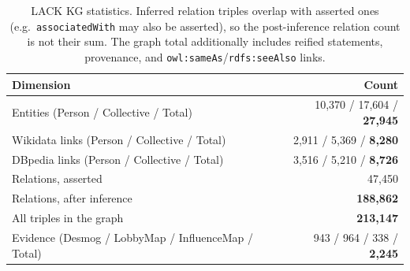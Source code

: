 

\begin{table}[t]
\centering
\caption{LACK KG statistics. Inferred relation triples overlap with asserted ones (e.g.\ \texttt{associatedWith} may also be asserted), so the post-inference relation count is not their sum. The graph total additionally includes reified statements, provenance, and \texttt{owl:sameAs}/\texttt{rdfs:seeAlso} links.}
\label{tab:kg-stats}
\small
\begin{tabular}{lr}
\toprule
\textbf{Dimension} & \textbf{Count} \\
\midrule
Entities (Person / Collective / Total)
  & 10,370 / 17,604 / \textbf{27,945} \\
\quad Wikidata links (Person / Collective / Total)
  & 2,911 / 5,369 / \textbf{8,280} \\
\quad DBpedia links (Person / Collective / Total)
  & 3,516 / 5,210 / \textbf{8,726} \\
\midrule
Relations, asserted          & 47,450 \\
Relations, after inference   & \textbf{188,862} \\
All triples in the graph     & \textbf{213,147} \\
Evidence (Desmog / LobbyMap / InfluenceMap / Total)
  & 943 / 964 / 338 / \textbf{2,245} \\
\bottomrule
\end{tabular}
\end{table}


